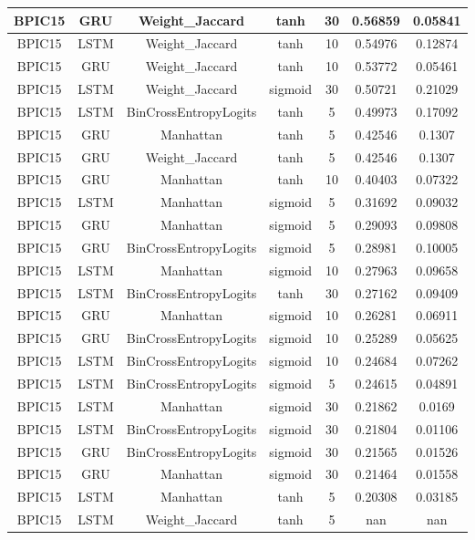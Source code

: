 \documentclass{article}%
\begin{document}
\begin{longtable}{|c|c|c|c|c|c|c|}
\hline%
BPIC15&GRU&Weight\_Jaccard&tanh&30&0.56859&0.05841\\%
\hline%
BPIC15&LSTM&Weight\_Jaccard&tanh&10&0.54976&0.12874\\%
\hline%
BPIC15&GRU&Weight\_Jaccard&tanh&10&0.53772&0.05461\\%
\hline%
BPIC15&LSTM&Weight\_Jaccard&sigmoid&30&0.50721&0.21029\\%
\hline%
BPIC15&LSTM&BinCrossEntropyLogits&tanh&5&0.49973&0.17092\\%
\hline%
BPIC15&GRU&Manhattan&tanh&5&0.42546&0.1307\\%
\hline%
BPIC15&GRU&Weight\_Jaccard&tanh&5&0.42546&0.1307\\%
\hline%
BPIC15&GRU&Manhattan&tanh&10&0.40403&0.07322\\%
\hline%
BPIC15&LSTM&Manhattan&sigmoid&5&0.31692&0.09032\\%
\hline%
BPIC15&GRU&Manhattan&sigmoid&5&0.29093&0.09808\\%
\hline%
BPIC15&GRU&BinCrossEntropyLogits&sigmoid&5&0.28981&0.10005\\%
\hline%
BPIC15&LSTM&Manhattan&sigmoid&10&0.27963&0.09658\\%
\hline%
BPIC15&LSTM&BinCrossEntropyLogits&tanh&30&0.27162&0.09409\\%
\hline%
BPIC15&GRU&Manhattan&sigmoid&10&0.26281&0.06911\\%
\hline%
BPIC15&GRU&BinCrossEntropyLogits&sigmoid&10&0.25289&0.05625\\%
\hline%
BPIC15&LSTM&BinCrossEntropyLogits&sigmoid&10&0.24684&0.07262\\%
\hline%
BPIC15&LSTM&BinCrossEntropyLogits&sigmoid&5&0.24615&0.04891\\%
\hline%
BPIC15&LSTM&Manhattan&sigmoid&30&0.21862&0.0169\\%
\hline%
BPIC15&LSTM&BinCrossEntropyLogits&sigmoid&30&0.21804&0.01106\\%
\hline%
BPIC15&GRU&BinCrossEntropyLogits&sigmoid&30&0.21565&0.01526\\%
\hline%
BPIC15&GRU&Manhattan&sigmoid&30&0.21464&0.01558\\%
\hline%
BPIC15&LSTM&Manhattan&tanh&5&0.20308&0.03185\\%
\hline%
BPIC15&LSTM&Weight\_Jaccard&tanh&5&nan&nan\\%
\hline%
\end{longtable}

%
\end{document}
